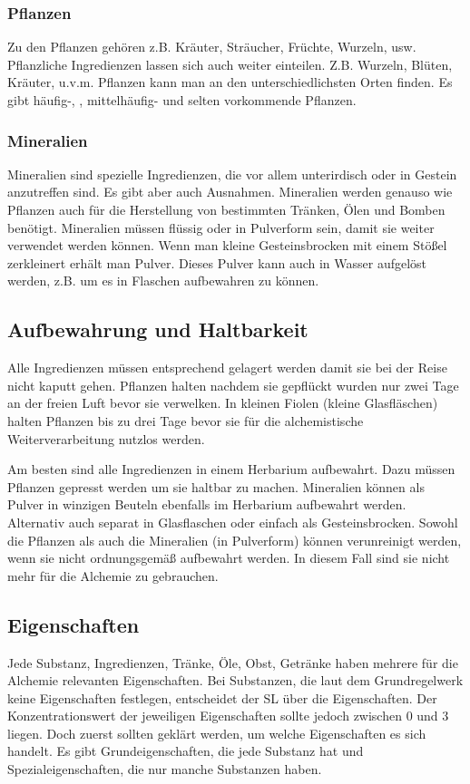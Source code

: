 \subsubsection{Pflanzen}
Zu den Pflanzen gehören z.B. Kräuter, Sträucher, Früchte, Wurzeln, usw. Pflanzliche Ingredienzen lassen sich auch weiter einteilen. Z.B. Wurzeln, Blüten, Kräuter, u.v.m. Pflanzen kann man an den unterschiedlichsten Orten finden. Es gibt häufig-, , mittelhäufig- und selten vorkommende Pflanzen.

\subsubsection{Mineralien}
Mineralien sind spezielle Ingredienzen, die vor allem unterirdisch oder in Gestein anzutreffen sind. Es gibt aber auch Ausnahmen. Mineralien werden genauso wie Pflanzen auch für die Herstellung von bestimmten Tränken, Ölen und Bomben benötigt. Mineralien müssen flüssig oder in Pulverform sein, damit sie weiter verwendet werden können. Wenn man kleine Gesteinsbrocken mit einem Stößel zerkleinert erhält man Pulver. Dieses Pulver kann auch in Wasser aufgelöst werden, z.B. um es in Flaschen aufbewahren zu können.

\subsection{Aufbewahrung und Haltbarkeit}
Alle Ingredienzen müssen entsprechend gelagert werden damit sie bei der Reise nicht kaputt gehen. Pflanzen halten nachdem sie gepflückt wurden nur zwei Tage an der freien Luft bevor sie verwelken. In kleinen Fiolen (kleine Glasfläschen) halten Pflanzen bis zu drei Tage bevor sie für die alchemistische Weiterverarbeitung nutzlos werden. 

Am besten sind alle Ingredienzen in einem Herbarium aufbewahrt. Dazu müssen Pflanzen
gepresst werden um sie haltbar zu machen. Mineralien können als Pulver in winzigen Beuteln ebenfalls im Herbarium aufbewahrt werden. Alternativ auch separat in Glasflaschen oder einfach als Gesteinsbrocken. Sowohl die Pflanzen als auch die Mineralien (in Pulverform) können verunreinigt werden, wenn sie nicht ordnungsgemäß aufbewahrt werden. In diesem Fall sind sie nicht mehr für die Alchemie zu gebrauchen.

\subsection{Eigenschaften}
Jede Substanz, Ingredienzen, Tränke, Öle, Obst, Getränke haben mehrere für die Alchemie relevanten Eigenschaften. Bei Substanzen, die laut dem Grundregelwerk keine Eigenschaften festlegen, entscheidet der SL über die Eigenschaften. Der Konzentrationswert der jeweiligen Eigenschaften sollte jedoch zwischen 0 und 3 liegen. Doch zuerst sollten geklärt werden, um welche Eigenschaften es sich handelt. Es gibt Grundeigenschaften, die jede Substanz hat und Spezialeigenschaften, die nur manche Substanzen haben.

